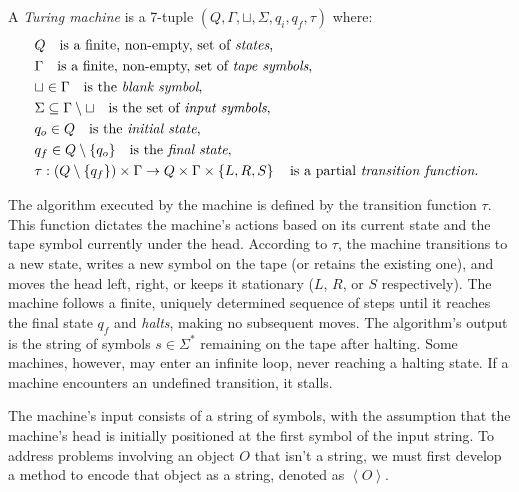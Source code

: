 \begin{definition}
\label{def:Turing-Machine}
A \emph{Turing machine} is a 7-tuple $\left(Q,\Gamma,\sqcup,\Sigma,q_{i},q_{f},\tau\right)$ where:
\begin{align*}
 & Q \quad \text{is a finite, non-empty, set of \emph{states},} \index{Machine State} \\
 & \Gamma \quad \text{is a finite, non-empty, set of \emph{tape symbols},} \index{Tape Symbol} \\
 & \sqcup\in\Gamma \quad \text{is the \emph{blank symbol},} \index{Blank Symbol} \\
 & \Sigma\subseteq\Gamma\setminus\sqcup \quad \text{is the set of \emph{input symbols},}  \index{Input Symbol} \\
 & q_{o}\in Q \quad \text{is the \emph{initial state},} \index{Initial State} \\
 & q_{f}\in Q \setminus \{q_o\} \quad \text{is the \emph{final state},} \index{Final State} \\ 
 & \tau:\left(Q\setminus \{q_{f}\}\right)\times\Gamma \rightarrow  Q\times\Gamma\times\left\{ L,R,S\right\} \quad\text{is a partial \emph{transition function}. \index{Transition Function} }
\end{align*}
\end{definition}

The algorithm executed by the machine is defined by the transition function $\tau$. This function dictates the machine's actions based on its current state and the tape symbol currently under the head. According to $\tau$, the machine transitions to a new state, writes a new symbol on the tape (or retains the existing one), and moves the head left, right, or keeps it stationary ($L$, $R$, or $S$ respectively). The machine follows a finite, uniquely determined sequence of steps until it reaches the final state $q_f$ and \emph{halts}, making no subsequent moves. The algorithm's output is the string of symbols $s \in \Sigma^\ast$ remaining on the tape after halting. Some machines, however, may enter an infinite loop, never reaching a halting state. If a machine encounters an undefined transition, it stalls.

The machine's input consists of a string of symbols, with the assumption that the machine's head is initially positioned at the first symbol of the input string. To address problems involving an object $O$ that isn’t a string, we must first develop a method to encode that object as a string, denoted as $\left\langle O \right\rangle$.

